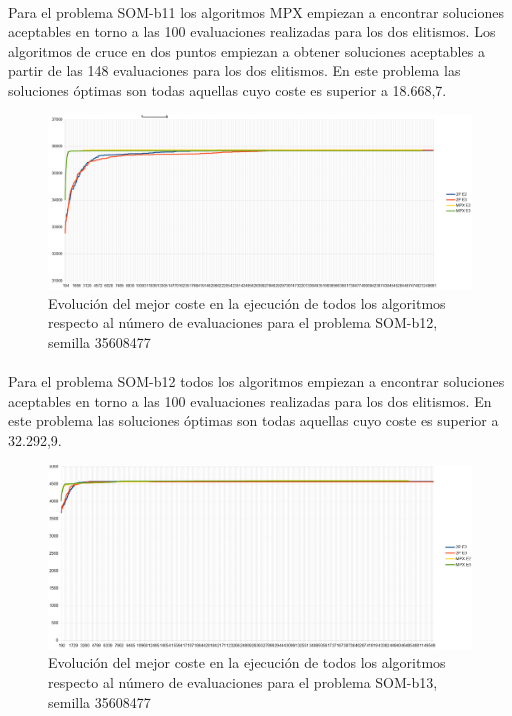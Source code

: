 	\paragraph{}Para el problema SOM-b11 los algoritmos MPX empiezan a encontrar soluciones aceptables en torno a las 100 evaluaciones realizadas para los dos elitismos. Los algoritmos de cruce en dos puntos empiezan a obtener soluciones aceptables a partir de las 148 evaluaciones para los dos elitismos. En este problema las soluciones óptimas son todas aquellas cuyo coste es superior a 18.668,7.

	\begin{figure}[H]
		\centering
		\includegraphics[scale=0.3]{img/35608477_SOM-b_12_n300_m90.png}
		\caption{Evolución del mejor coste en la ejecución de todos los algoritmos respecto al número de evaluaciones para el problema SOM-b12, semilla 35608477}
		\label{SOM-b_12_historico}
	\end{figure}

	\paragraph{}Para el problema SOM-b12 todos los algoritmos empiezan a encontrar soluciones aceptables en torno a las 100 evaluaciones realizadas para los dos elitismos. En este problema las soluciones óptimas son todas aquellas cuyo coste es superior a 32.292,9.

	\begin{figure}[H]
		\centering
		\includegraphics[scale=0.3]{img/35608477_SOM-b_13_n300_m90.png}
		\caption{Evolución del mejor coste en la ejecución de todos los algoritmos respecto al número de evaluaciones para el problema SOM-b13, semilla 35608477}
		\label{SOM-b_13_historico}
	\end{figure}

